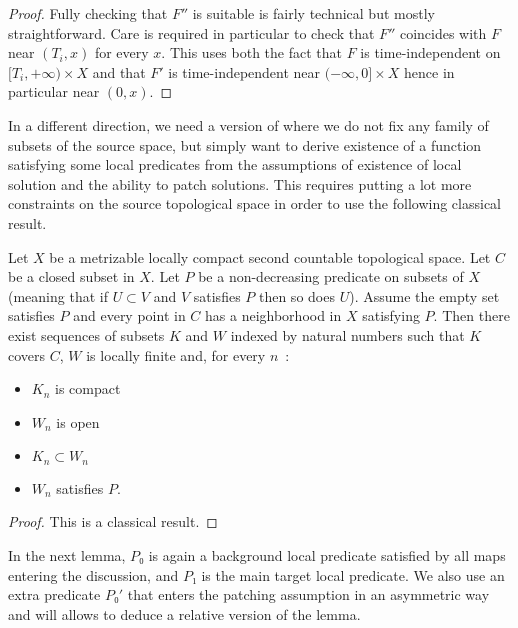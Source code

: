 \begin{proof}
  Fully checking that $F''$ is suitable is fairly technical but mostly straightforward.
  Care is required in particular to check that $F''$ coincides with $F$ near
  $(T_i, x)$ for every $x$. This uses both the fact that $F$ is time-independent on
  $[T_i, + ∞) × X$ and that $F'$ is time-independent near $(-∞, 0] × X$ hence in particular
  near $(0, x)$.
\end{proof}

In a different direction, we need a version of  where
we do not fix any family of subsets of the source space, but simply want to derive existence
of a function satisfying some local predicates from the assumptions of
existence of local solution and the ability to patch solutions. This requires putting a lot
more constraints on the source topological space in order to use the following classical
result.

\begin{lemma}
  \label{lem:exists_locally_finite_subcover_of_locally}
  \leanok
  Let $X$ be a metrizable locally compact second countable topological space.
  Let $C$ be a closed subset in $X$. Let $P$ be a non-decreasing predicate on subsets
  of $X$ (meaning that if $U ⊂ V$ and $V$ satisfies $P$ then so does $U$). Assume
  the empty set satisfies $P$ and every point in $C$ has a neighborhood in $X$
  satisfying $P$. Then there exist sequences of subsets $K$ and $W$ indexed by
  natural numbers such that $K$ covers $C$, $W$ is locally finite and, for every $n$~:
  \begin{itemize}
    \item $K_n$ is compact
    \item $W_n$ is open
    \item $K_n ⊂ W_n$
    \item $W_n$ satisfies $P$.
  \end{itemize}
\end{lemma}

\begin{proof}
  \leanok
  This is a classical result.
\end{proof}

In the next lemma, $P₀$ is again a background local predicate satisfied by all
maps entering the discussion, and $P₁$ is the main target local predicate. We also use
an extra predicate $P₀'$ that enters the patching assumption in an asymmetric way
and will allows to deduce a relative version of the lemma.

